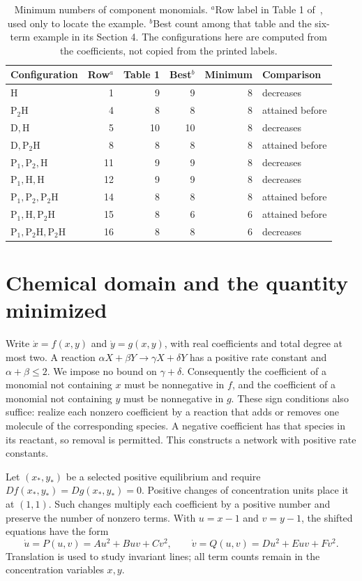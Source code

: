 \documentclass[11pt,a4paper]{article}
\theoremstyle{definition}\newtheorem{definition}[theorem]{Definition}
\newcommand{\HH}{\mathrm H}
\newcommand{\PP}{\mathrm P}
\newcommand{\DD}{\mathrm D}
\begin{document}
\begin{table}[ht]
\centering
\small
\begin{tabular}{@{}lrrrrl@{}}
\toprule
Configuration & Row$^{a}$ & Table 1 & Best$^{b}$ & Minimum & Comparison \\
\midrule
$\HH$ & 1 & 9 & 9 & 8 & decreases \\
$\PP_2\HH$ & 4 & 8 & 8 & 8 & attained before \\
$\DD,\HH$ & 5 & 10 & 10 & 8 & decreases \\
$\DD,\PP_2\HH$ & 8 & 8 & 8 & 8 & attained before \\
$\PP_1,\PP_2,\HH$ & 11 & 9 & 9 & 8 & decreases \\
$\PP_1,\HH,\HH$ & 12 & 9 & 9 & 8 & decreases \\
$\PP_1,\PP_2,\PP_2\HH$ & 14 & 8 & 8 & 8 & attained before \\
$\PP_1,\HH,\PP_2\HH$ & 15 & 8 & 6 & 6 & attained before \\
$\PP_1,\PP_2\HH,\PP_2\HH$ & 16 & 8 & 8 & 6 & decreases \\
\bottomrule
\end{tabular}
\caption{Minimum numbers of component monomials. $^{a}$Row label in Table 1
of~\cite{YE}, used only to locate the example. $^{b}$Best count among that
table and the six-term example in its Section 4. The configurations here are
computed from the coefficients, not copied from the printed labels.}
\label{tab:minima}
\end{table}

\section{Chemical domain and the quantity minimized}
Write $\dot x=f(x,y)$ and $\dot y=g(x,y)$, with real coefficients and total
degree at most two. A reaction
$\alpha X+\beta Y\longrightarrow\gamma X+\delta Y$ has a positive rate
constant and $\alpha+\beta\leq2$. We impose no bound on
$\gamma+\delta$. Consequently the coefficient of a monomial not containing
$x$ must be nonnegative in $f$, and the coefficient of a monomial not
containing $y$ must be nonnegative in $g$.
These sign conditions also suffice: realize each nonzero coefficient by a
reaction that adds or removes one molecule of the corresponding species.
A negative coefficient has that species in its reactant, so removal is
permitted. This constructs a network with positive rate constants.

Let $(x_*,y_*)$ be a selected positive equilibrium and require
$Df(x_*,y_*)=Dg(x_*,y_*)=0$. Positive changes of concentration units place it
at $(1,1)$. Such changes multiply each coefficient by a positive number and
preserve the number of nonzero terms. With $u=x-1$ and $v=y-1$, the shifted
equations have the form
\begin{equation}\label{eq:shifted}
 \dot u=P(u,v)=Au^2+Buv+Cv^2,\qquad
 \dot v=Q(u,v)=Du^2+Euv+Fv^2.
\end{equation}
Translation is used to study invariant lines; all term counts remain in
the concentration variables $x,y$.
\end{document}
